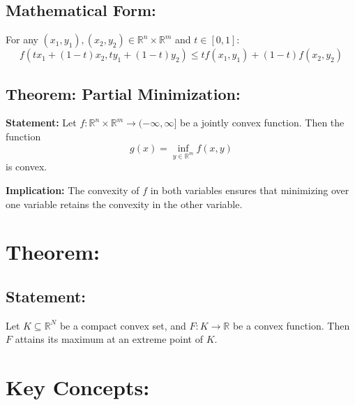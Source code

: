 \documentclass{article}
\begin{document}
\subsection*{Mathematical Form:}
For any \( (x_1, y_1), (x_2, y_2) \in \mathbb{R}^n \times \mathbb{R}^m \) and \( t \in [0, 1] \):
\[
f(tx_1 + (1 - t)x_2, ty_1 + (1 - t)y_2) \leq tf(x_1, y_1) + (1 - t)f(x_2, y_2)
\]

\subsection*{Theorem: Partial Minimization:}

\textbf{Statement:} Let \( f : \mathbb{R}^n \times \mathbb{R}^m \rightarrow (-\infty, \infty] \) be a jointly convex function. Then the function 
\[
g(x) = \inf_{y \in \mathbb{R}^m} f(x, y)
\]
is convex.

\textbf{Implication:} The convexity of \( f \) in both variables ensures that minimizing over one variable retains the convexity in the other variable.









\section*{Theorem:}

\subsection*{Statement:}
Let \( K \subseteq \mathbb{R}^N \) be a compact convex set, and \( F : K \to \mathbb{R} \) be a convex function. Then \( F \) attains its maximum at an extreme point of \( K \).

\section*{Key Concepts:}
\end{document}

